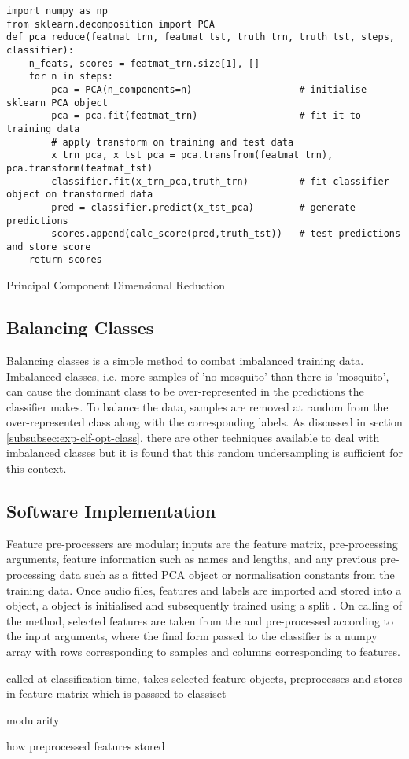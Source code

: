         \begin{listing}[ht]
            \begin{verbatim}
import numpy as np
from sklearn.decomposition import PCA
def pca_reduce(featmat_trn, featmat_tst, truth_trn, truth_tst, steps, classifier):
    n_feats, scores = featmat_trn.size[1], []
    for n in steps:
        pca = PCA(n_components=n)                   # initialise sklearn PCA object
        pca = pca.fit(featmat_trn)                  # fit it to training data
        # apply transform on training and test data
        x_trn_pca, x_tst_pca = pca.transfrom(featmat_trn), pca.transform(featmat_tst)
        classifier.fit(x_trn_pca,truth_trn)         # fit classifier object on transformed data
        pred = classifier.predict(x_tst_pca)        # generate predictions
        scores.append(calc_score(pred,truth_tst))   # test predictions and store score
    return scores
            \end{verbatim}
            \caption{Principal Component Dimensional Reduction}
            \label{code:pl-featpreproc-sel-pca}
        \end{listing} 
    
    \subsection{Balancing Classes}
    \label{subsec:pl-featpreproc-bal}
        Balancing classes is a simple method to combat imbalanced training data. Imbalanced classes, i.e. more samples of 'no mosquito' than there is 'mosquito', can cause the dominant class to be over-represented in the predictions the classifier makes. To balance the data, samples are removed at random from the over-represented class along with the corresponding labels. As discussed in section \ref{subsubsec:exp-clf-opt-class}, there are other techniques available to deal with imbalanced classes but it is found that this random undersampling is sufficient for this context.
    
    \subsection{Software Implementation}
    \label{subsec:pl-featpreproc-software}
        Feature pre-processers are modular; inputs are the feature matrix, pre-processing arguments, feature information such as names and lengths, and any previous pre-processing data such as a fitted PCA object or normalisation constants from the training data.
        Once audio files, features and labels are imported and stored into a  object, a  object is initialised and subsequently trained using a split . On calling of the  method, selected features are taken from the  and pre-processed according to the input arguments, where the final form passed to the classifier is a numpy array with rows corresponding to samples and columns corresponding to features. 
        
       
        \begin{sitemize}
            \item{called at classification time, takes selected feature objects, preprocesses and stores in feature matrix which is passsed to classiset}
            \item{modularity}
            \item{how preprocessed features stored}
        \end{sitemize}
    